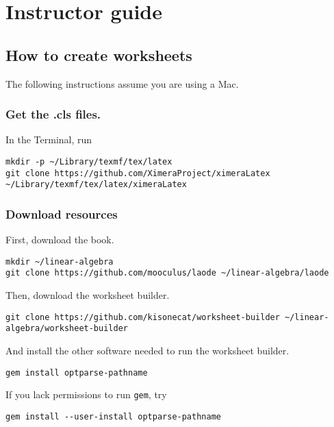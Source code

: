 \documentclass{article}
\begin{document}
\tableofcontents

\section{Instructor guide}\label{instructor-guide}

\subsection{How to create worksheets}\label{how-to-create-worksheets}

The following instructions assume you are using a Mac.

\subsubsection{Get the .cls files.}\label{get-the-.cls-files.}

In the Terminal, run

\begin{verbatim}
mkdir -p ~/Library/texmf/tex/latex
git clone https://github.com/XimeraProject/ximeraLatex ~/Library/texmf/tex/latex/ximeraLatex
\end{verbatim}

\subsubsection{Download resources}\label{download-resources}

First, download the book.

\begin{verbatim}
mkdir ~/linear-algebra
git clone https://github.com/mooculus/laode ~/linear-algebra/laode
\end{verbatim}

Then, download the worksheet builder.

\begin{verbatim}
git clone https://github.com/kisonecat/worksheet-builder ~/linear-algebra/worksheet-builder
\end{verbatim}

And install the other software needed to run the worksheet builder.

\begin{verbatim}
gem install optparse-pathname
\end{verbatim}

If you lack permissions to run \texttt{gem}, try

\begin{verbatim}
gem install --user-install optparse-pathname
\end{verbatim}
\end{document}
